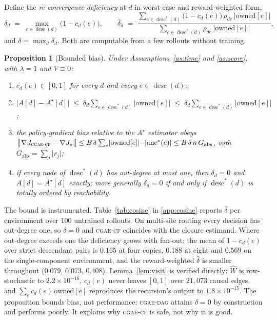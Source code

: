 \documentclass[review,authoryear,3p,times]{elsarticle}
\newtheorem{proposition}{Proposition}
\newcommand{\cflow}{\textsc{cgae-cf}}          %
\newcommand{\cdag}{\textsc{cgae-dag}}          %
\newcommand{\desc}{\operatorname{desc}}
\newcommand{\anc}{\operatorname{anc}}
\begin{document}
Define the \emph{re-convergence deficiency} at $d$ in worst-case and
reward-weighted form,
\[
  \delta_d \;=\; \max_{e\in\desc(d)}\bigl(1-c_d(e)\bigr),
  \qquad
  \bar\delta_d \;=\;
  \frac{\sum_{e\in\desc^{*}(d)}\bigl(1-c_d(e)\bigr)\,\rho_{de}\,\lvert\mathrm{owned}[e]\rvert}
       {\sum_{e\in\desc^{*}(d)}\rho_{de}\,\lvert\mathrm{owned}[e]\rvert},
\]
and $\delta=\max_d \delta_d$. Both are computable from a few rollouts without
training.

\begin{proposition}[Bounded bias]
\label{prop:bias}
Under Assumptions~\ref{as:time} and \ref{as:score}, with $\lambda=1$ and
$V\equiv0$:
\begin{enumerate}
\item[(i)] $c_d(e)\in[0,1]$ for every $d$ and every $e\in\desc(d)$;
\item[(ii)] $\bigl\lvert A[d]-A^\star[d]\bigr\rvert
      \;\le\; \bar\delta_d \sum_{e\in\desc^{*}(d)}\lvert\mathrm{owned}[e]\rvert
      \;\le\; \delta_d \sum_{e\in\desc^{*}(d)}\lvert\mathrm{owned}[e]\rvert$;
\item[(iii)] the policy-gradient bias relative to the $A^\star$ estimator obeys
      $\bigl\lVert \nabla J_{\cflow} - \nabla J_{\star}\bigr\rVert
        \le B\,\delta \sum_{e}\lvert\mathrm{owned}[e]\rvert\cdot
                \lvert\anc^{*}(e)\rvert
        \le B\,\delta\,n\,G_{\mathrm{abs}}$,
      with $G_{\mathrm{abs}}=\sum_j\lvert r_j\rvert$;
\item[(iv)] if every node of $\desc^{*}(d)$ has out-degree at most one, then
      $\delta_d=0$ and $A[d]=A^\star[d]$ exactly; more generally $\delta_d=0$
      if and only if $\desc^{*}(d)$ is totally ordered by reachability.
\end{enumerate}
\end{proposition}

The bound is instrumented. Table~\ref{tab:cosine} in \ref{app:cosine} reports
$\bar\delta$ per environment over $100$ untrained rollouts. On multi-site
routing every decision has out-degree one, so $\delta=0$ and \cflow{} coincides
with the closure estimand. Where out-degree exceeds one the deficiency grows
with fan-out: the mean of $1-c_d(e)$ over strict descendant pairs is $0.165$
at four copies, $0.188$ at eight and $0.569$ on the single-component
environment, and the reward-weighted $\bar\delta$ is smaller throughout
($0.079$, $0.073$, $0.408$). Lemma~\ref{lem:visit} is verified directly: $\hat
W$ is row-stochastic to $2.2\times10^{-16}$, $c_d(e)$ never leaves $[0,1]$ over
$21{,}073$ causal edges, and $\sum_e c_d(e)\,\mathrm{owned}[e]$ reproduces the
recursion's output to $1.8\times10^{-15}$. The proposition bounds bias, not
performance: \cdag{} attains $\delta=0$ by construction and performs poorly. It
explains why \cflow{} is safe, not why it is good.
\end{document}
